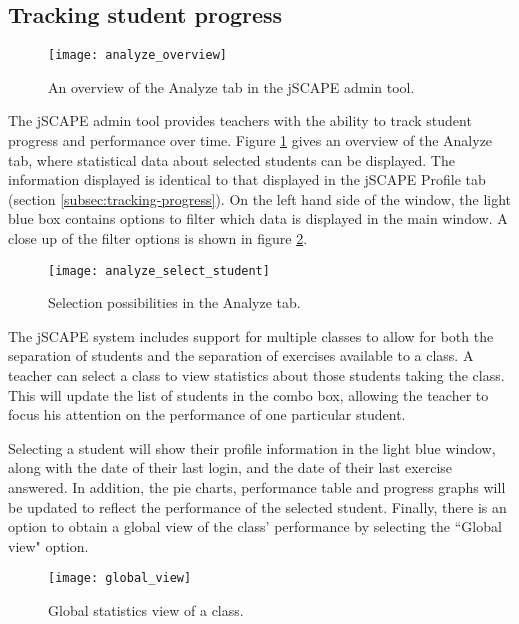 \subsection{Tracking student progress}
\begin{figure}[H]
\centering
\texttt{[image: analyze\_overview]}
\caption{An overview of the Analyze tab in the jSCAPE admin tool.}
\label{fig:analyze_overview}
\end{figure}

The jSCAPE admin tool provides teachers with the ability to track student progress and performance over time. Figure \ref{fig:analyze_overview} gives an overview of the Analyze tab, where statistical data about selected students can be displayed. The information displayed is identical to that displayed in the jSCAPE Profile tab (section \ref{subsec:tracking-progress}). On the left hand side of the window, the light blue box contains options to filter which data is displayed in the main window. A close up of the filter options is shown in figure \ref{fig:analyze_select_student}.

\begin{figure}[H]
\centering
\texttt{[image: analyze\_select\_student]}
\caption{Selection possibilities in the Analyze tab.}
\label{fig:analyze_select_student}
\end{figure}

The jSCAPE system includes support for multiple classes to allow for both the separation of students and the separation of exercises available to a class. A teacher can select a class to view statistics about those students taking the class. This will update the list of students in the combo box, allowing the teacher to focus his attention on the performance of one particular student. \newline

Selecting a student will show their profile information in the light blue window, along with the date of their last login, and the date of their last exercise answered. In addition, the pie charts, performance table and progress graphs will be updated to reflect the performance of the selected student. Finally, there is an option to obtain a global view of the class' performance by selecting the ``Global view" option. 

\begin{figure}[H]
\centering
\texttt{[image: global\_view]}
\caption{Global statistics view of a class.}
\label{fig:global_view}
\end{figure}

